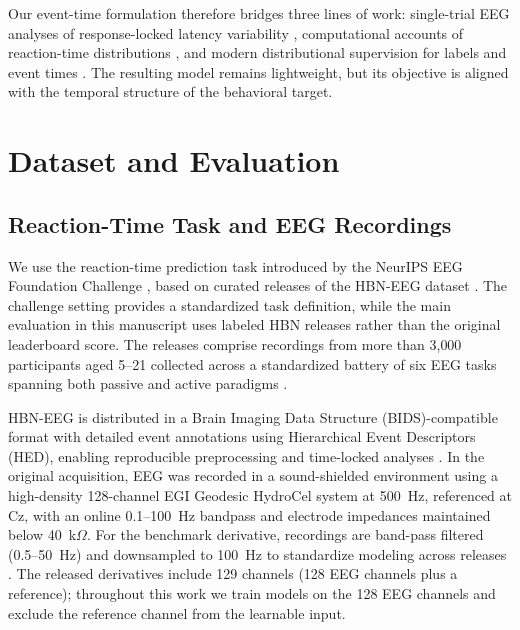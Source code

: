 \documentclass[12pt]{article}
\begin{document}
Our event-time formulation therefore bridges three lines of work: single-trial EEG
analyses of response-locked latency variability
\citep{Jung1998SingleTrialERP,Ouyang2017LatencyReview}, computational accounts of
reaction-time distributions
\citep{Ratcliff2008Diffusion,OConnell2012Supramodal,Kelly2013Internal}, and modern
distributional supervision for labels and event times
\citep{Geng2016LabelDistributionLearning,Lee2018DeepHit,Chapfuwa2023Calibration,Haider2020SurvivalDistributions}.
The resulting model remains lightweight, but its objective is aligned with the temporal
structure of the behavioral target.


\section{Dataset and Evaluation}

\subsection{Reaction-Time Task and EEG Recordings}

We use the reaction-time prediction task introduced by the NeurIPS EEG Foundation Challenge \citep{EEGChallengeWebsite2025,EEGFoundationChallengeArxiv2025}, based on curated releases of the HBN-EEG dataset \citep{Shirazi2024HBNEEG}. The challenge setting provides a standardized task definition, while the main evaluation in this manuscript uses labeled HBN releases rather than the original leaderboard score. The releases comprise recordings from more than 3{,}000 participants aged 5--21 collected across a standardized battery of six EEG tasks spanning both passive and active paradigms \citep{Shirazi2024HBNEEG,EEGChallengeWebsite2025}.

HBN-EEG is distributed in a Brain Imaging Data Structure (BIDS)-compatible format with detailed event annotations using Hierarchical Event Descriptors (HED), enabling reproducible preprocessing and time-locked analyses \citep{Shirazi2024HBNEEG}. In the original acquisition, EEG was recorded in a sound-shielded environment using a high-density 128-channel EGI Geodesic HydroCel system at 500~Hz, referenced at Cz, with an online 0.1--100~Hz bandpass and electrode impedances maintained below 40~k$\Omega$. For the benchmark derivative, recordings are band-pass filtered (0.5--50~Hz) and downsampled to 100~Hz to standardize modeling across releases \citep{EEGChallengeWebsite2025}. The released derivatives include 129 channels (128 EEG channels plus a reference); throughout this work we train models on the 128 EEG channels and exclude the reference channel from the learnable input.
\end{document}
